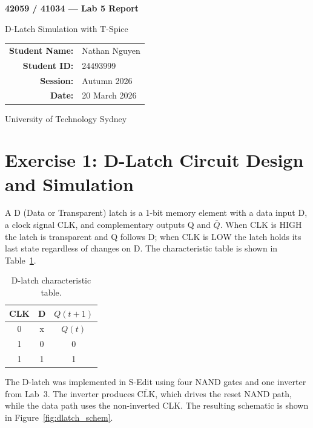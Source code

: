 \documentclass[12pt, a4paper]{article}
\begin{document}
\begin{titlepage}
    \centering
    \vspace*{2cm}
    {\LARGE\bfseries 42059 / 41034 --- Lab 5 Report\par}
    \vspace{0.5cm}
    {\Large D-Latch Simulation with T-Spice\par}
    \vspace{1.5cm}
    \begin{tabular}{rl}
        \textbf{Student Name:} & Nathan Nguyen       \\[0.4em]
        \textbf{Student ID:}   & 24493999         \\[0.4em]
        \textbf{Session:}      & Autumn 2026  \\[0.4em]
        \textbf{Date:}         & 20 March 2026 \\
    \end{tabular}
    \vfill
    {\small University of Technology Sydney}
\end{titlepage}

\section{Exercise 1: D-Latch Circuit Design and Simulation}

A D (Data or Transparent) latch is a 1-bit memory element with a data input D, a clock signal CLK, and complementary outputs Q and $\bar{Q}$. When CLK is HIGH the latch is transparent and Q follows D; when CLK is LOW the latch holds its last state regardless of changes on D. The characteristic table is shown in Table~\ref{tab:dlatch_truth}.

\begin{table}[H]
    \centering
    \caption{D-latch characteristic table.}
    \label{tab:dlatch_truth}
    \begin{tabular}{ccc}
        \toprule
        CLK & D & $Q(t+1)$ \\
        \midrule
        0 & x & $Q(t)$ \\
        1 & 0 & 0 \\
        1 & 1 & 1 \\
        \bottomrule
    \end{tabular}
\end{table}

The D-latch was implemented in S-Edit using four NAND gates and one inverter from Lab~3. The inverter produces $\overline{\text{CLK}}$, which drives the reset NAND path, while the data path uses the non-inverted CLK. The resulting schematic is shown in Figure~\ref{fig:dlatch_schem}.
\end{document}
